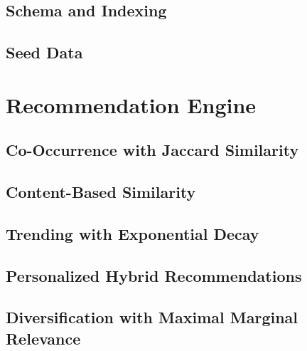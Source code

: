 \subsection{Schema and Indexing}
\label{subsec:impl-schema}


\subsection{Seed Data}
\label{subsec:impl-seed}


\section{Recommendation Engine}
\label{sec:impl-recommendations}

\subsection{Co-Occurrence with Jaccard Similarity}
\label{subsec:impl-jaccard}


\subsection{Content-Based Similarity}
\label{subsec:impl-content-sim}


\subsection{Trending with Exponential Decay}
\label{subsec:impl-trending}


\subsection{Personalized Hybrid Recommendations}
\label{subsec:impl-personalized}


\subsection{Diversification with Maximal Marginal Relevance}
\label{subsec:impl-mmr}

